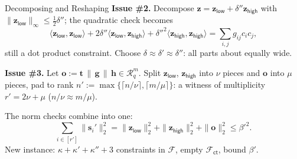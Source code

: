 \documentclass{zkdl-presentation-template}
\begin{document}
    \begin{frame}{Decomposing and Reshaping}
        \textbf{Issue \#2.} Decompose $\mathbf{z} = \mathbf{z}_{\mathsf{low}} + \delta''\mathbf{z}_{\mathsf{high}}$ with $\|\mathbf{z}_{\mathsf{low}}\|_{\infty} \leq \frac{1}{2}\delta''$; the quadratic check becomes
        \begin{equation*}
            \langle \mathbf{z}_{\mathsf{low}}, \mathbf{z}_{\mathsf{low}} \rangle + 2\delta''\langle \mathbf{z}_{\mathsf{low}}, \mathbf{z}_{\mathsf{high}} \rangle + \delta''^2\langle \mathbf{z}_{\mathsf{high}}, \mathbf{z}_{\mathsf{high}} \rangle = \sum_{i,j} g_{ij}c_ic_j,
        \end{equation*}
        still a dot product constraint. Choose $\delta \approx \delta' \approx \delta''$: all parts about equally wide.
        \pause

        \textbf{Issue \#3.} Let $\mathbf{o} := \mathbf{t}\,\|\,\mathbf{g}\,\|\,\mathbf{h} \in \mathcal{R}_q^m$. Split $\mathbf{z}_{\mathsf{low}}$, $\mathbf{z}_{\mathsf{high}}$ into $\nu$ pieces and $\mathbf{o}$ into $\mu$ pieces, pad to rank $n' := \max\{\lceil n/\nu \rceil, \lceil m/\mu \rceil\}$: a witness of multiplicity $r' = 2\nu + \mu$ ($n/\nu \approx m/\mu$).
        \pause

        The norm checks combine into one:
        \begin{equation*}
            \sum_{i \in [r']} \|\mathbf{s}_i'\|_2^2 = \|\mathbf{z}_{\mathsf{low}}\|_2^2 + \|\mathbf{z}_{\mathsf{high}}\|_2^2 + \|\mathbf{o}\|_2^2 \leq \beta'^2.
        \end{equation*}
        New instance: $\kappa + \kappa' + \kappa'' + 3$ constraints in $\mathcal{F}$, empty $\mathcal{F}_{\mathsf{ct}}$, bound $\beta'$.
    \end{frame}
\end{document}

